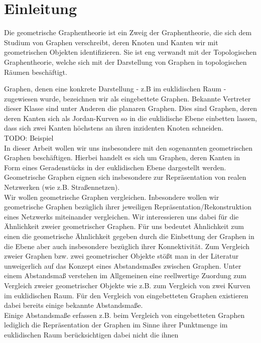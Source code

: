 \documentclass[a4paper, 12pt, twoside]{article}
\theoremstyle{Format1} %
\begin{document}
\newpage
\tableofcontents
\newpage\null\thispagestyle{empty}\newpage %
\section{Einleitung}

Die geometrische Graphentheorie ist ein Zweig der Graphentheorie, die sich dem Studium von Graphen verschreibt, deren Knoten und Kanten wir mit geometrischen Objekten identifizieren.
Sie ist eng verwandt mit der Topologischen Graphentheorie, welche sich mit der Darstellung von Graphen in topologischen Räumen beschäftigt.

Graphen, denen eine konkrete Darstellung - z.B im euklidischen Raum - zugewiesen wurde, bezeichnen wir als eingebettete Graphen.
Bekannte Vertreter dieser Klasse sind unter Anderen die planaren Graphen. Dies sind Graphen, deren deren Kanten sich als Jordan-Kurven so in die euklidische
Ebene einbetten lassen, dass sich zwei Kanten höchstens an ihren inzidenten Knoten schneiden.
\\
TODO: Beispiel
\\
In dieser Arbeit wollen wir uns insbesondere mit den sogenannten geometrischen Graphen beschäftigen. Hierbei handelt es sich um Graphen,
deren Kanten in Form eines Geradenstücks in der euklidischen Ebene dargestellt werden.
Geometrische Graphen eignen sich insbesondere zur Repräsentation von realen Netzwerken (wie z.B. Straßennetzen).
\\
Wir wollen geometrische Graphen vergleichen.
Inbesondere wollen wir geometrische Graphen bezüglich ihrer jeweiligen Repräsentation/Rekonstruktion eines Netzwerks miteinander vergleichen.
Wir interessieren uns dabei für die Ähnlichkeit zweier geometrischer Graphen. Für uns bedeutet Ähnlichkeit zum einen die geometrische Ähnlichkeit gegeben durch die
Einbettung der Graphen in die Ebene aber auch insbesondere bezüglich ihrer Konnektivität.
Zum Vergleich zweier Graphen bzw. zwei geometrischer Objekte stößt man in der Literatur unweigerlich auf das Konzept eines Abstandsmaßes zwischen Graphen.
Unter einem Abstandsmaß verstehen im Allgemeinen eine reellwertige Zuordung zum Vergleich zweier geometrischer Objekte wie z.B. zum Vergleich von zwei Kurven im euklidischen Raum.
Für den Vergleich von eingebetteten Graphen existieren dabei bereits einige bekannte Abstandsmaße.
\\
Einige Abstandsmaße erfassen z.B. beim Vergleich von eingebetteten Graphen lediglich die Repräsentation der Graphen im Sinne ihrer Punktmenge im euklidischen Raum berücksichtigen dabei nicht die ihnen
\end{document}
